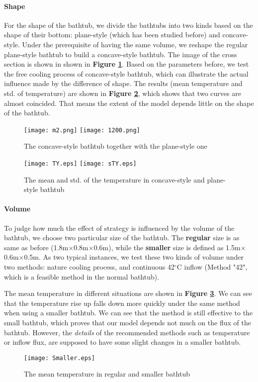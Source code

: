 \documentclass{HZNUMCM}
\begin{document}
\paragraph{Shape}For the shape of the bathtub, we divide the bathtubs into two kinds based on the
shape of their bottom: plane-style (which has been studied before) and concave-style. Under the
prerequisite of having the same volume, we reshape the regular plane-style bathtub to build a
concave-style bathtub. The image of the cross section is shown in shown in \textbf{Figure
\ref{bathtub}}. Based on the parameters before, we test the free cooling process of concave-style
bathtub, which can illustrate the actual influence made by the difference of shape. The results
(mean temperature and std. of temperature) are shown in \textbf{Figure \ref{s4}}, which shows that
two curves are almost coincided. That means the extent of the model depends little on the shape of
the bathtub.
\begin{figure}[!htbp]
\small
\centering
\texttt{[image: m2.png]}
\texttt{[image: 1200.png]}
\caption{The concave-style bathtub together with the plane-style one}\label{bathtub}
\end{figure}

\begin{figure}[!htbp]
\small
\centering
\texttt{[image: TY.eps]}
\texttt{[image: sTY.eps]}
\caption{The mean and std. of the temperature in concave-style and plane-style bathtub}\label{s4}
\end{figure}


\paragraph{Volume}To judge how much the effect of strategy is influenced by the volume of the
bathtub, we choose two particular size of the bathtub. The \textbf{regular} size is as same as
before (1.8m$\times$0.8m$\times$0.6m), while the \textbf{smaller} size is defined as
1.5m$\times$0.6m$\times$0.5m. As two typical instances, we test these two kinds of volume under two
methods: nature cooling process, and continuous 42$^\circ$C inflow (Method "42", which is a feasible
method in the normal bathtub).

The mean temperature in different situations are shown in \textbf{Figure \ref{s5}}. We can see that
the temperature rise up falls down more quickly under the same method when using a smaller bathtub.
We can see that the method is still effective to the small bathtub, which proves that our model
depends not much on the flux of the bathtub. However, the \emph{details} of the recommended methods
such as temperature or inflow flux, are supposed to have some slight changes in a smaller bathtub.
\begin{figure}[!htbp]
\small
\centering
\texttt{[image: Smaller.eps]}
\caption{The mean temperature in regular and smaller bathtub}\label{s5}
\end{figure}
\end{document}
